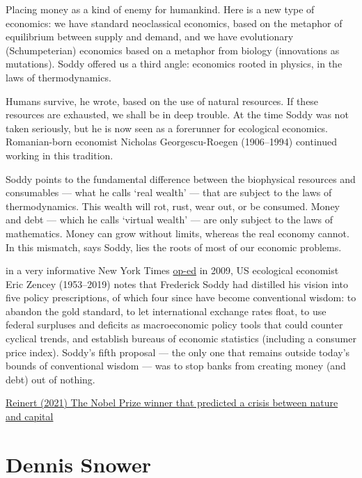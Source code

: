 \documentclass[
]{book}
\begin{document}
Placing money as a kind of enemy for humankind. Here is a new type of economics: we have standard neoclassical economics, based on the metaphor of equilibrium between supply and demand, and we have evolutionary (Schumpeterian) economics based on a metaphor from biology (innovations as mutations). Soddy offered us a third angle: economics rooted in physics, in the laws of thermodynamics.

Humans survive, he wrote, based on the use of natural resources. If these resources are exhausted, we shall be in deep trouble. At the time Soddy was not taken seriously, but he is now seen as a forerunner for ecological economics. Romanian-born economist Nicholas Georgescu-Roegen (1906--1994) continued working in this tradition.

Soddy points to the fundamental difference between the biophysical resources and consumables --- what he calls `real wealth' --- that are subject to the laws of thermodynamics. This wealth will rot, rust, wear out, or be consumed. Money and debt --- which he calls `virtual wealth' --- are only subject to the laws of mathematics. Money can grow without limits, whereas the real economy cannot. In this mismatch, says Soddy, lies the roots of most of our economic problems.

in a very informative New York Times \href{https://www.nytimes.com/2009/04/12/opinion/12zencey.html}{op-ed} in 2009, US ecological economist Eric Zencey (1953--2019) notes that Frederick Soddy had distilled his vision into five policy prescriptions, of which four since have become conventional wisdom: to abandon the gold standard, to let international exchange rates float, to use federal surpluses and deficits as macroeconomic policy tools that could counter cyclical trends, and establish bureaus of economic statistics (including a consumer price index). Soddy's fifth proposal --- the only one that remains outside today's bounds of conventional wisdom --- was to stop banks from creating money (and debt) out of nothing.

\href{https://developingeconomics.org/2021/12/27/the-nobel-prize-winner-that-predicted-a-crisis-between-nature-and-capital/}{Reinert (2021) The Nobel Prize winner that predicted a crisis between nature and capital}

\hypertarget{dennis-snower}{%
\section{Dennis Snower}\label{dennis-snower}}
\end{document}
